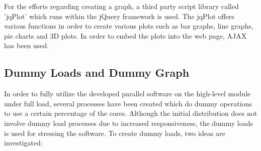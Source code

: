 For the efforts regarding creating a graph, a third party script library called 'jqPlot' \cite{jqplot} which runs within the jQuery framework is used.  The jqPlot offers various functions in order to create various plots such as bar graphs, line graphs, pie charts and 3D plots. In order to embed the plots into the web page, AJAX has been used.

\subsection{Dummy Loads and Dummy Graph}
In order to fully utilize the developed parallel software on the high-level module under full load, several processes have been created which do dummy operations to use a certain percentage of the cores. Although the initial distribution does not involve dummy load processes due to increased responsiveness, the dummy loads is used for stressing the software. To create dummy loads, two ideas are investigated:
